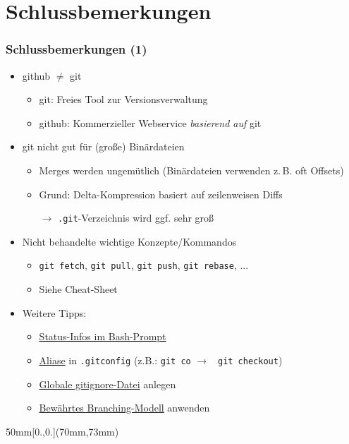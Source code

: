 \documentclass{beamer}
\begin{document}
\section{Schlussbemerkungen}

\begin{frame}[fragile,label=schluss10]
\frametitle{Schlussbemerkungen (1)}
\begin{itemize}
\item github $\neq$ git
\begin{itemize}
 \item git: Freies Tool zur Versionsverwaltung
 \item github: Kommerzieller Webservice \textit{basierend auf} git
\end{itemize}
\bigskip
\pause
\item git nicht gut für (große) Binärdateien
\begin{itemize}
 \item Merges werden ungemütlich (Binärdateien verwenden z.\,B. oft Offsets)
 \item Grund: Delta-Kompression basiert auf zeilenweisen Diffs
 \item[$\rightarrow$] \verb|.git|-Verzeichnis wird ggf. sehr groß
\end{itemize}
\bigskip
\pause
\item Nicht behandelte wichtige Konzepte/Kommandos
\begin{itemize}
 \item \verb|git fetch|, \verb|git pull|, \verb|git push|,  \verb|git rebase|, ...
 \item Siehe Cheat-Sheet
\end{itemize}
\bigskip
\pause
\item Weitere Tipps:
\begin{itemize}
\item \href{https://github.com/magicmonty/bash-git-prompt}{Status-Infos im Bash-Prompt}
\item \href{https://git-scm.com/book/en/v2/Git-Basics-Git-Aliases}{Aliase} in \verb|.gitconfig| (z.B.: \verb|git co| $\rightarrow$ \verb| git checkout|)
\item \href{https://stackoverflow.com/a/7335487/333403}{Globale gitignore-Datei} anlegen
\item \href{http://nvie.com/posts/a-successful-git-branching-model/}{Bewährtes Branching-Modell} anwenden
\end{itemize}

\end{itemize}
\begin{textblock*}{50mm}[0.,0.](70mm,73mm)
\end{textblock*}

\end{frame}
\end{document}
